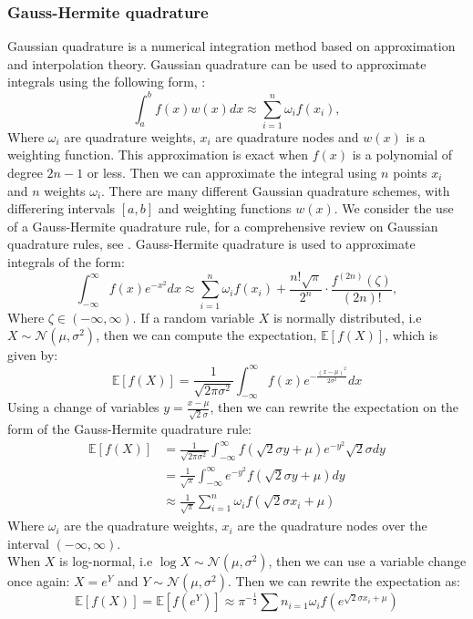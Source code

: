 \documentclass[11pt]{article}
\begin{document}
\subsubsection{Gauss-Hermite quadrature} \label{Subsection: Gauss-Hermite}
Gaussian quadrature is a numerical integration method based on approximation and interpolation theory.
Gaussian quadrature can be used to approximate integrals using the following form, \textcite{Judd1998Book}:
\begin{equation}
  \int_{a}^{b} f(x) w(x) dx \approx \sum_{i=1}^{n} \omega_{i} f(x_{i}),
\end{equation}
Where $\omega_i$ are quadrature weights, $x_i$ are quadrature nodes and $w(x)$ is a weighting function.
This approximation is exact when $f(x)$ is a polynomial of degree $2n-1$ or less.
Then we can approximate the integral using $n$ points $x_i$ and $n$ weights $\omega_i$.
There are many different Gaussian quadrature schemes, with differering intervals $[a,b]$ and weighting functions $w(x)$.
We consider the use of a Gauss-Hermite quadrature rule, for a comprehensive review on Gaussian quadrature rules, see \textcite{Judd1998Book}.
Gauss-Hermite quadrature is used to approximate integrals of the form:
\begin{equation}
  \int_{-\infty}^{\infty} f(x) e^{-x^{2}} dx \approx \sum_{i=1}^{n} \omega_{i} f(x_{i}) + \frac{n! \sqrt{\pi}}{2^{n}} 
  \cdot \frac{f^{(2n) }(\zeta )}{(2n)!},
\end{equation}
Where $\zeta \in (-\infty , \infty)$.
If a random variable $X$ is normally distributed, i.e  $X \sim \mathcal{N}(\mu , \sigma^{2})$,
then we can compute the expectation, $\mathbb{E}[f(X)]$, which is given by:
\begin{equation}
  \mathbb{E} [f(X)] =  \frac{1}{\sqrt{2\pi \sigma^{2}} } \int_{-\infty}^{\infty} f(x)  e^{-\frac{(x-\mu)^{2}}{2\sigma^{2}}} dx 
\end{equation}
Using a change of variables $y = \frac{x-\mu}{\sqrt{2}\sigma}$, then we can rewrite the expectation on the form of the Gauss-Hermite quadrature rule:
\begin{align}
  \mathbb{E} [f(X)] &=  \frac{1}{\sqrt{2\pi \sigma^{2}} } \int_{-\infty}^{\infty} f( \sqrt{2} \sigma y + \mu)  e^{-y^{2}} \sqrt{2} \sigma dy \\
  &= \frac{1}{\sqrt{\pi}} \int_{-\infty}^{\infty} e^{-y^{2}} f( \sqrt{2} \sigma y + \mu) dy \\
  &\approx \frac{1}{\sqrt{\pi}} \sum_{i=1}^{n} \omega_{i} f( \sqrt{2} \sigma x_{i} + \mu)
\end{align}
Where $\omega_i$ are the quadrature weights, $x_i$ are the quadrature nodes over the interval $(-\infty , \infty)$.\\
When $X$ is log-normal, i.e $\log X \sim \mathcal{N}(\mu , \sigma^{2})$, then we can use a variable change once again:
$X = e^{Y}$ and $Y \sim \mathcal{N}(\mu , \sigma^{2})$. Then we can rewrite the expectation as:
\begin{equation}
  \mathbb{E} [ f(X) ] = \mathbb{E} [ f(e^{Y}) ] \approx \pi^{-\frac{1}{2}} \sum{n}_{i=1} \omega_i f \left( e^{ \sqrt{2} \sigma x_{i} + \mu } \right)
\end{equation}
\end{document}
